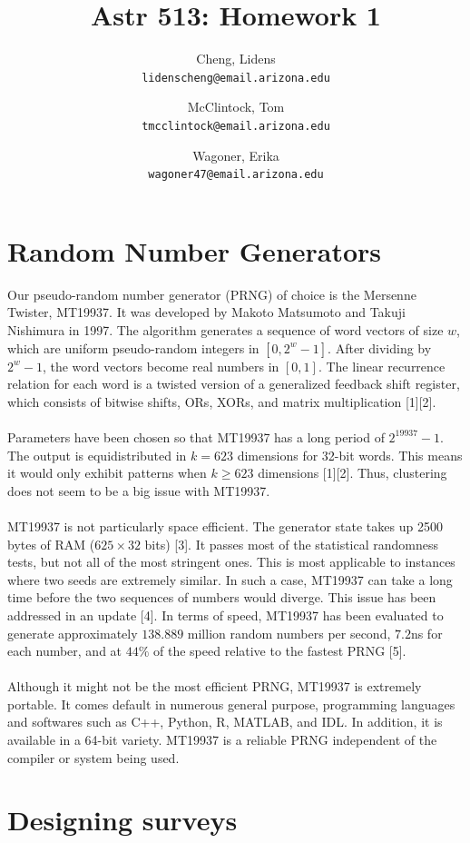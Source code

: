 \documentclass[12pt,a4paper]{article}
\author{
  Cheng, Lidens\\
  \texttt{lidenscheng@email.arizona.edu}
  \and
  McClintock, Tom\\
  \texttt{tmcclintock@email.arizona.edu}
  \and
  Wagoner, Erika\\
  \texttt{wagoner47@email.arizona.edu}
}
\title{Astr 513: Homework 1}
\begin{document}
\maketitle
  
\section{Random Number Generators}
Our pseudo-random number generator (PRNG) of choice is the Mersenne Twister, MT19937. It was developed by Makoto Matsumoto and Takuji Nishimura in 1997. The algorithm generates a sequence of word vectors of size $w$, which are uniform pseudo-random integers in $[0,2^w-1]$. After dividing by $2^w-1$, the word vectors become real numbers in $[0,1]$. The linear recurrence relation for each word is a twisted version of a generalized feedback shift register, which consists of bitwise shifts, ORs, XORs, and matrix multiplication [1][2]. \\\\ 
Parameters have been chosen so that MT19937 has a long period of $2^{19937}-1$. The output is equidistributed in $k=623$ dimensions for 32-bit words. This means it would only exhibit patterns when $k \geq 623$ dimensions [1][2]. Thus, clustering does not seem to be a big issue with MT19937.\\\\
MT19937 is not particularly space efficient. The generator state takes up 2500 bytes of RAM ($625 \times 32$ bits) [3]. It passes most of the statistical randomness tests, but not all of the most stringent ones. This is most applicable to instances where two seeds are extremely similar. In such a case, MT19937 can take a long time before the two sequences of numbers would diverge. This issue has been addressed in an update [4]. In terms of speed, MT19937 has been evaluated to generate approximately $138.889$ million random numbers per second, $7.2$ns for each number, and at $44\%$ of the speed relative to the fastest PRNG [5]. \\\\
Although it might not be the most efficient PRNG, MT19937 is extremely portable. It comes default in numerous general purpose, programming languages and softwares such as C++, Python, R, MATLAB, and IDL. In addition, it is available in a 64-bit variety. MT19937 is a reliable PRNG independent of the compiler or system being used.  

\section{Designing surveys}
\end{document}
